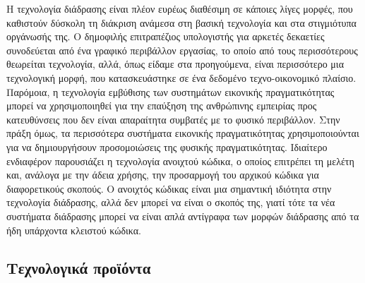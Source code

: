 \documentclass[
]{article}
\begin{document}
Η τεχνολογία διάδρασης είναι πλέον ευρέως διαθέσιμη σε κάποιες λίγες
μορφές, που καθιστούν δύσκολη τη διάκριση ανάμεσα στη βασική τεχνολογία
και στα στιγμιότυπα οργάνωσής της. Ο δημοφιλής επιτραπέζιος υπολογιστής
για αρκετές δεκαετίες συνοδεύεται από ένα γραφικό περιβάλλον εργασίας,
το οποίο από τους περισσότερους θεωρείται τεχνολογία, αλλά, όπως είδαμε
στα προηγούμενα, είναι περισσότερο μια τεχνολογική μορφή, που
κατασκευάστηκε σε ένα δεδομένο τεχνο-οικονομικό πλαίσιο. Παρόμοια, η
τεχνολογία εμβύθισης των συστημάτων εικονικής πραγματικότητας μπορεί να
χρησιμοποιηθεί για την επαύξηση της ανθρώπινης εμπειρίας προς
κατευθύνσεις που δεν είναι απαραίτητα συμβατές με το φυσικό περιβάλλον.
Στην πράξη όμως, τα περισσότερα συστήματα εικονικής πραγματικότητας
χρησιμοποιούνται για να δημιουργήσουν προσομοιώσεις της φυσικής
πραγματικότητας. Ιδιαίτερο ενδιαφέρον παρουσιάζει η τεχνολογία ανοιχτού
κώδικα, ο οποίος επιτρέπει τη μελέτη και, ανάλογα με την άδεια χρήσης,
την προσαρμογή του αρχικού κώδικα για διαφορετικούς σκοπούς. Ο ανοιχτός
κώδικας είναι μια σημαντική ιδιότητα στην τεχνολογία διάδρασης, αλλά δεν
μπορεί να είναι ο σκοπός της, γιατί τότε τα νέα συστήματα διάδρασης
μπορεί να είναι απλά αντίγραφα των μορφών διάδρασης από τα ήδη υπάρχοντα
κλειστού κώδικα.

\hypertarget{ux3c4ux3b5ux3c7ux3bdux3bfux3bbux3bfux3b3ux3b9ux3baux3ac-ux3c0ux3c1ux3bfux3caux3ccux3bdux3c4ux3b1}{%
\subsection{Τεχνολογικά
προϊόντα}\label{ux3c4ux3b5ux3c7ux3bdux3bfux3bbux3bfux3b3ux3b9ux3baux3ac-ux3c0ux3c1ux3bfux3caux3ccux3bdux3c4ux3b1}}
\end{document}
